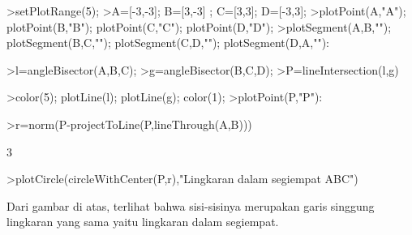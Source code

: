 \documentclass{article}
\begin{document}
\begin{eulernotebook}
\begin{eulercomment}
\begin{eulercomment}
\begin{eulercomment}
\begin{eulercomment}
\begin{eulercomment}
\begin{eulercomment}
\begin{eulercomment}
\begin{eulercomment}
\begin{eulercomment}
\end{eulercomment}
\begin{eulerprompt}
>setPlotRange(5);
>A=[-3,-3];  B=[3,-3] ; C=[3,3]; D=[-3,3];
>plotPoint(A,"A"); plotPoint(B,"B"); plotPoint(C,"C"); plotPoint(D,"D");
>plotSegment(A,B,""); plotSegment(B,C,""); plotSegment(C,D,""); plotSegment(D,A,""):
\end{eulerprompt}
\begin{eulerprompt}
>l=angleBisector(A,B,C);
>g=angleBisector(B,C,D);
>P=lineIntersection(l,g)
\end{eulerprompt}
\begin{euleroutput}
  [0,  0]
\end{euleroutput}
\begin{eulerprompt}
>color(5); plotLine(l); plotLine(g); color(1);
>plotPoint(P,"P"):
\end{eulerprompt}
\begin{eulerprompt}
>r=norm(P-projectToLine(P,lineThrough(A,B)))
\end{eulerprompt}
\begin{euleroutput}
  3
\end{euleroutput}
\begin{eulerprompt}
>plotCircle(circleWithCenter(P,r),"Lingkaran dalam segiempat ABC")
\end{eulerprompt}
\begin{eulercomment}
Dari gambar di atas, terlihat bahwa sisi-sisinya merupakan garis
singgung lingkaran yang sama yaitu lingkaran dalam segiempat.


\end{eulercomment}
\end{eulercomment}
\end{eulercomment}
\end{eulercomment}
\end{eulercomment}
\end{eulercomment}
\end{eulercomment}
\end{eulercomment}
\end{eulercomment}
\end{eulernotebook}
\end{document}
